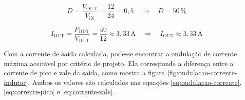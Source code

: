 \begin{equation}
    D = \frac{V_{\mathrm{OUT}}}{V_{\mathrm{IN}}}
    = \frac{12}{24}
    = 0{,}5
    \quad\Rightarrow\quad
    \boxed{D = 50\,\%}
    \label{eq:duty-cycle-proj}
\end{equation}

\begin{equation}
    I_{\mathrm{OUT}} =
    \frac{P_{\mathrm{OUT}}}{V_{\mathrm{OUT}}}=
    \frac{40}{12}
    \approx 3{,}33\,\mathrm{A}
    \quad\Rightarrow\quad
    \boxed{I_{\mathrm{OUT}} \approx 3{,}33\,\mathrm{A}}
    \label{eq:corrente-saida}
\end{equation}
  
Com a corrente de saída calculada, pode-se encontrar a ondulação de corrente máxima aceitável por critério de projeto. Ela corresponde a diferença entre a corrente de pico e vale da saída, como mostra a figura \ref{fig:ondulacao-corrente-indutor}. Ambos os valores são calculados nas equações \ref{eq:ondulacao-corrente}, \ref{eq:corrente-pico} e \ref{eq:corrente-vale}.

